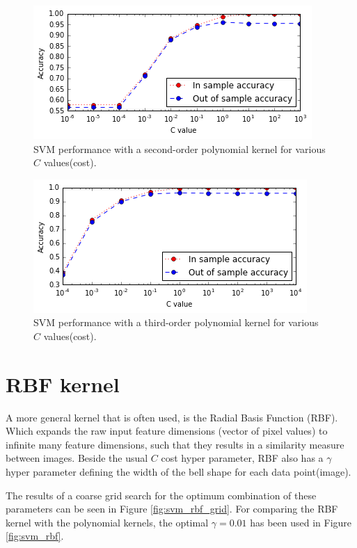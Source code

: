 \documentclass[a4paper,10pt,article,oneside,english]{memoir}
\begin{document}
\begin{figure}[h!]
	\centering
	\includegraphics[width=0.7\linewidth]{svm_poly2.PNG}
	\caption{SVM performance with a second-order polynomial kernel for various $C$ values(cost).}
	\label{fig:svm_poly2}
\end{figure}

\begin{figure}[h!]
	\centering
	\includegraphics[width=0.7\linewidth]{svm_poly3.PNG}
	\caption{SVM performance with a third-order polynomial kernel for various $C$ values(cost).}
	\label{fig:svm_poly3}
\end{figure}








\section{RBF kernel}
A more general kernel that is often used, is the Radial Basis Function (RBF).
Which expands the raw input feature dimensions (vector of pixel values) to infinite many feature dimensions, such that they results in a similarity measure between images. Beside the usual $C$ cost hyper parameter, RBF also has a $\gamma$ hyper parameter defining the width of the bell shape for each data point(image). 


The results of a coarse grid search for the optimum combination of these parameters can be seen in Figure \ref{fig:svm_rbf_grid}. 
For comparing the RBF kernel with the polynomial kernels, the optimal $\gamma=0.01$ has been used in Figure \ref{fig:svm_rbf}.
\end{document}
